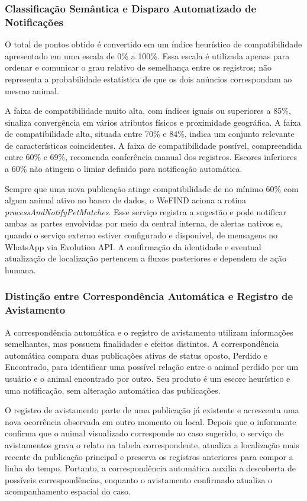 \subsubsection{Classificação Semântica e Disparo Automatizado de Notificações}

O total de pontos obtido é convertido em um índice heurístico de compatibilidade apresentado em uma escala de 0\% a 100\%. Essa escala é utilizada apenas para ordenar e comunicar o grau relativo de semelhança entre os registros; não representa a probabilidade estatística de que os dois anúncios correspondam ao mesmo animal.

A faixa de compatibilidade muito alta, com índices iguais ou superiores a 85\%, sinaliza convergência em vários atributos físicos e proximidade geográfica. A faixa de compatibilidade alta, situada entre 70\% e 84\%, indica um conjunto relevante de características coincidentes. A faixa de compatibilidade possível, compreendida entre 60\% e 69\%, recomenda conferência manual dos registros. Escores inferiores a 60\% não atingem o limiar definido para notificação automática.

Sempre que uma nova publicação atinge compatibilidade de no mínimo 60\% com algum animal ativo no banco de dados, o WeFIND aciona a rotina \textit{processAndNotifyPetMatches}. Esse serviço registra a sugestão e pode notificar ambas as partes envolvidas por meio da central interna, de alertas nativos e, quando o serviço externo estiver configurado e disponível, de mensagens no WhatsApp via Evolution API. A confirmação da identidade e eventual atualização de localização pertencem a fluxos posteriores e dependem de ação humana.

\subsubsection{Distinção entre Correspondência Automática e Registro de Avistamento}

A correspondência automática e o registro de avistamento utilizam informações semelhantes, mas possuem finalidades e efeitos distintos. A correspondência automática compara duas publicações ativas de status oposto, Perdido e Encontrado, para identificar uma possível relação entre o animal perdido por um usuário e o animal encontrado por outro. Seu produto é um escore heurístico e uma notificação, sem alteração automática das publicações.

O registro de avistamento parte de uma publicação já existente e acrescenta uma nova ocorrência observada em outro momento ou local. Depois que o informante confirma que o animal visualizado corresponde ao caso sugerido, o serviço de avistamentos grava o relato na tabela correspondente, atualiza a localização mais recente da publicação principal e preserva os registros anteriores para compor a linha do tempo. Portanto, a correspondência automática auxilia a descoberta de possíveis correspondências, enquanto o avistamento confirmado atualiza o acompanhamento espacial do caso.


